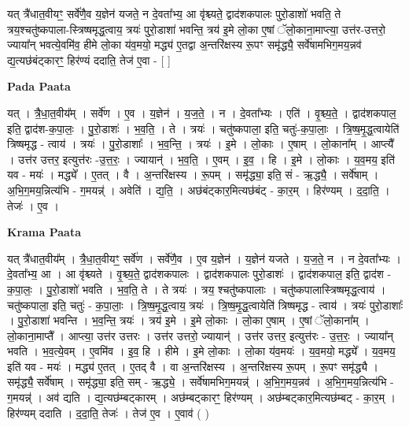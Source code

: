 \documentclass[17pt]{extarticle}
\begin{document}
यत् त्रै॑धात॒वीयꣳ॒॒ सर्वे॑णै॒व य॒ज्ञेन॑ यजते॒ न दे॒वता᳚भ्य॒ आ वृ॑श्च्यते॒ द्वाद॑शकपालः पुरो॒डाशो॑ भवति॒ ते त्रय॒श्चतु॑ष्कपाला-स्त्रिष्षमृद्ध॒त्वाय॒ त्रयः॑ पुरो॒डाशा॑ भवन्ति॒ त्रय॑ इ॒मे लो॒का ए॒षां ॅलो॒काना॒माप्त्या॒ उत्त॑र-उत्तरो॒ ज्याया᳚न् भवत्ये॒वमि॑व॒ हीमे लो॒का य॑व॒मयो॒ मद्ध्य॑ ए॒तद्वा अ॒न्तरि॑क्षस्य रू॒पꣳ समृ॑द्ध्यै॒ सर्वे॑षामभिग॒मय॒न्नव॑ द्य॒त्यछ॑बंट्कारꣳ॒॒ हिर॑ण्यं ददाति॒ तेज॑ ए॒वा - [  ] \newline

\textbf{Pada Paata} \newline

यत् । त्रै॒धा॒त॒वीय᳚म् । सर्वे॑ण । ए॒व । य॒ज्ञेन॑ । य॒ज॒ते॒ । न । दे॒वता᳚भ्यः । एति॑ । वृ॒श्च्य॒ते॒ । द्वाद॑शकपाल॒ इति॒ द्वाद॑श-क॒पा॒लः॒ । पु॒रो॒डाशः॑ । भ॒व॒ति॒ । ते । त्रयः॑ । चतु॑ष्कपाला॒ इति॒ चतुः॑-क॒पा॒लाः॒ । त्रि॒ष्ष॒मृ॒द्ध॒त्वायेति॑ त्रिष्षमृद्ध - त्वाय॑ । त्रयः॑ । पु॒रो॒डाशाः᳚ । भ॒व॒न्ति॒ ।   त्रयः॑ । इ॒मे । लो॒काः । ए॒षाम् । लो॒काना᳚म् ।  आप्त्यै᳚ । उत्त॑र उत्तर॒ इत्युत्त॑रः -उ॒त्त॒रः॒ ।  ज्यायान्॑ । भ॒व॒ति॒ । ए॒वम् । इ॒व॒ । हि । इ॒मे । लो॒काः । य॒व॒मय॒ इति॑ यव - मयः॑ । मद्ध्ये᳚ । ए॒तत् ।   वै । अ॒न्तरि॑क्षस्य । रू॒पम् । समृ॑द्ध्या॒ इति॒ सं - ऋ॒द्ध्यै॒ । सर्वे॑षाम् । अ॒भि॒ग॒मय॒न्नित्य॑भि - ग॒मयन्न्॑ । अवेति॑ । द्य॒ति॒ । अछ॑बंट्कार॒मित्यछ॑बंट् - का॒र॒म् । हिर॑ण्यम् । द॒दा॒ति॒ । तेजः॑ । ए॒व ।  \newline


\textbf{Krama Paata} \newline

यत् त्रै॑धात॒वीय᳚म् । त्रै॒धा॒त॒वीयꣳ॒॒ सर्वे॑ण । सर्वे॑णै॒व । ए॒व य॒ज्ञेन॑ । य॒ज्ञेन॑ यजते । य॒ज॒ते॒ न । न दे॒वता᳚भ्यः । दे॒वता᳚भ्य॒ आ । आ वृ॑श्च्यते । वृ॒श्च्य॒ते॒ द्वाद॑शकपालः । द्वाद॑शकपालः पुरो॒डाशः॑ । द्वाद॑शकपाल॒ इति॒ द्वाद॑श - क॒पा॒लः॒ । पु॒रो॒डाशो॑ भवति । भ॒व॒ति॒ ते । ते त्रयः॑ । त्रय॒ श्चतु॑ष्कपालाः । चतु॑ष्कपालास्त्रिष्षमृद्ध॒त्वाय॑ । चतु॑ष्कपाला॒ इति॒ चतुः॑ - क॒पा॒लाः॒ । त्रि॒ष्ष॒मृ॒द्ध॒त्वाय॒ त्रयः॑ । त्रि॒ष्ष॒मृ॒द्ध॒त्वायेति॑ त्रिष्षमृद्ध - त्वाय॑ । त्रयः॑ पुरो॒डाशाः᳚ । पु॒रो॒डाशा॑ भवन्ति । भ॒व॒न्ति॒ त्रयः॑ । त्रय॑ इ॒मे । इ॒मे लो॒काः । लो॒का ए॒षाम् । ए॒षां ॅलो॒काना᳚म् । लो॒काना॒माप्तै᳚ । आप्त्या॒ उत्त॑र उत्तरः । उत्त॑र उत्तरो॒ ज्यायान्॑ । उत्त॑र उत्तर॒ इत्युत्त॑रः - उ॒त्त॒रः॒ । ज्याया᳚न् भवति । भ॒व॒त्ये॒वम् । ए॒वमि॑व । इ॒व॒ हि । हीमे । इ॒मे लो॒काः । लो॒का य॑व॒मयः॑ । य॒व॒मयो॒ मद्ध्ये᳚ । य॒व॒मय॒ इति॑ यव - मयः॑ । मद्ध्य॑ ए॒तत् । ए॒तद् वै । वा अ॒न्तरि॑क्षस्य । अ॒न्तरि॑क्षस्य रू॒पम् । रू॒पꣳ समृ॑द्ध्यै । समृ॑द्ध्यै॒ सर्वे॑षाम् । समृ॑द्ध्या॒ इति॒ सम् - ऋ॒द्ध्ये॒ । सर्वे॑षामभिग॒मयन्न्॑ । अ॒भि॒ग॒मय॒न्नव॑ । अ॒भि॒ग॒मय॒न्नित्य॑भि - ग॒मयन्न्॑ । अव॑ द्यति । द्य॒त्यछ॑म्बट्कारम् । 
अछ॑म्बट्कारꣳ॒॒ हिर॑ण्यम् । अछ॑म्बट्कार॒मित्यछ॑म्बट् - का॒र॒म् । हिर॑ण्यम् ददाति । द॒दा॒ति॒ तेजः॑ । तेज॑ ए॒व । ए॒वाव॑ ( ) \newline
\end{document}
